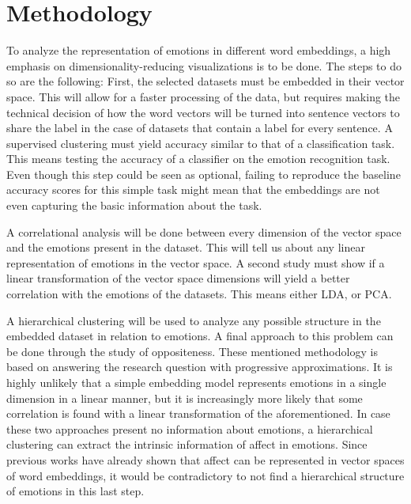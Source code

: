 \chapter{Methodology}
\label{chap:Methodology}

To analyze the representation of emotions in different word embeddings, a high emphasis on dimensionality-reducing visualizations is to be done. The steps to do so are the following:
First, the selected datasets must be embedded in their vector space. This will allow for a faster processing of the data, but requires making the technical decision of how the word vectors will be turned into sentence vectors to share the label in the case of datasets that contain a label for every sentence.
A supervised clustering must yield accuracy similar to that of a classification task. This means testing the accuracy of a classifier on the emotion recognition task. Even though this step could be seen as optional, failing to reproduce the baseline accuracy scores for this simple task might mean that the embeddings are not even capturing the basic information about the task.

A correlational analysis will be done between every dimension of the vector space and the emotions present in the dataset. This will tell us about any linear representation of emotions in the vector space.
A second study must show if a linear transformation of the vector space dimensions will yield a better correlation with the emotions of the datasets. This means either LDA, or PCA.

A hierarchical clustering will be used to analyze any possible structure in the embedded dataset in relation to emotions.
A final approach to this problem can be done through the study of oppositeness.
These mentioned methodology is based on answering the research question with progressive approximations. It is highly unlikely that a simple embedding model represents emotions in a single dimension in a linear manner, but it is increasingly more likely that some correlation is found with a linear transformation of the aforementioned. In case these two approaches present no information about emotions, a hierarchical clustering can extract the intrinsic information of affect in emotions. Since previous works have already shown that affect can be represented in vector spaces of word embeddings, it would be contradictory to not find a hierarchical structure of emotions in this last step.
